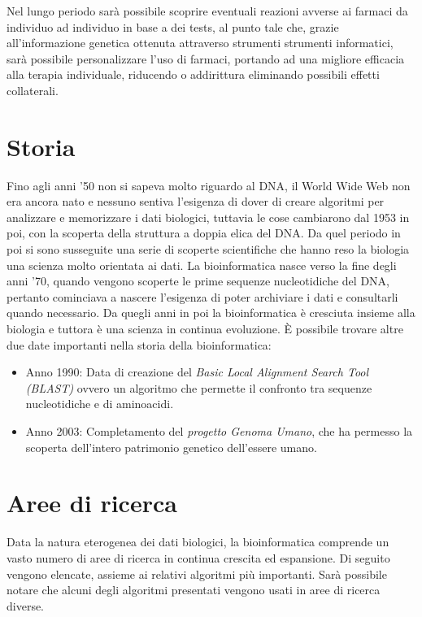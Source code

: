 \newline
Nel lungo periodo sarà possibile scoprire eventuali reazioni avverse ai farmaci da individuo ad individuo in base a dei tests, al punto tale che, grazie all'informazione genetica ottenuta attraverso strumenti strumenti informatici, sarà possibile personalizzare l'uso di farmaci, portando ad una migliore efficacia alla terapia individuale, riducendo o addirittura eliminando possibili effetti collaterali.


\section{Storia}
Fino agli anni '50 non si sapeva molto riguardo al DNA, il World Wide Web non era ancora nato e nessuno sentiva l'esigenza di dover di creare algoritmi per analizzare e memorizzare i dati biologici, tuttavia le cose cambiarono dal 1953 in poi, con la scoperta della struttura a doppia elica del DNA. Da quel periodo in poi si sono susseguite una serie di scoperte scientifiche che hanno reso la biologia una scienza molto orientata ai dati.
\newline
La bioinformatica nasce verso la fine degli anni '70, quando vengono scoperte le prime sequenze nucleotidiche del DNA, pertanto cominciava a nascere l'esigenza di poter archiviare i dati e consultarli quando necessario. Da quegli anni in poi la bioinformatica è cresciuta insieme alla biologia e tuttora è una scienza in continua evoluzione.
\newline
\`E possibile trovare altre due date importanti nella storia della bioinformatica:
\begin{itemize}
	\item Anno 1990: Data di creazione del \textit{Basic Local Alignment Search Tool (BLAST)}\cite{BLAST} ovvero un algoritmo che permette il confronto tra sequenze nucleotidiche e di aminoacidi.
	\item Anno 2003: Completamento del \textit{progetto Genoma Umano}, che ha permesso la scoperta dell'intero patrimonio genetico dell'essere umano.
\end{itemize}


\section{Aree di ricerca}
Data la natura eterogenea dei dati biologici, la bioinformatica comprende un vasto numero di aree di ricerca in continua crescita ed espansione. Di seguito vengono elencate, assieme ai relativi algoritmi più importanti. 
\newline
Sarà possibile notare che alcuni degli algoritmi presentati vengono usati in aree di ricerca diverse.

